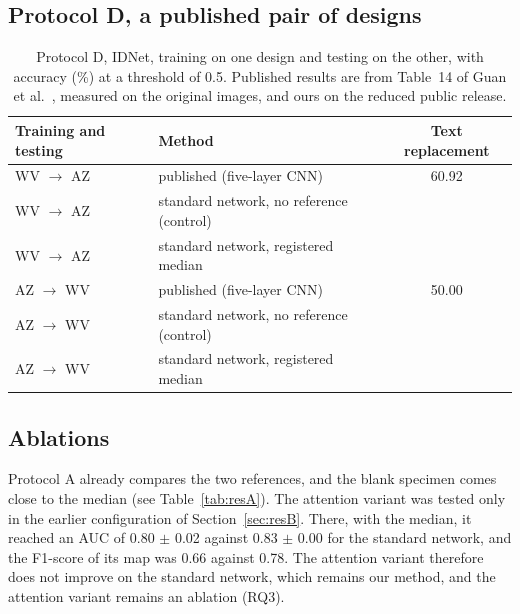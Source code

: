 \documentclass[12pt,a4paper]{article}
\newif\ifshowguidance
\newcommand{\todo}[1]{\ifshowguidance\leavevmode{\color{gray}\itshape [#1]}\fi}
\begin{document}
\subsection{Protocol D, a published pair of designs}
\begin{table}[H]
\centering\small
\setlength{\tabcolsep}{4pt}
\caption{Protocol D, IDNet, training on one design and testing on the other, with accuracy (\%) at a threshold of 0.5. Published results are from Table~14 of Guan et al.~\cite{guan2024idnetarxiv}, measured on the original images, and ours on the reduced public release.}
\label{tab:resD}
\begin{tabular}{llc}
\toprule
Training and testing & Method & Text replacement \\
\midrule
WV $\rightarrow$ AZ & published (five-layer CNN) & 60.92 \\
WV $\rightarrow$ AZ & standard network, no reference (control) & \todo{} \\
WV $\rightarrow$ AZ & standard network, registered median & \todo{} \\
\midrule
AZ $\rightarrow$ WV & published (five-layer CNN) & 50.00 \\
AZ $\rightarrow$ WV & standard network, no reference (control) & \todo{} \\
AZ $\rightarrow$ WV & standard network, registered median & \todo{} \\
\bottomrule
\end{tabular}
\end{table}

\subsection{Ablations}
Protocol A already compares the two references, and the blank specimen comes close to the median (see Table~\ref{tab:resA}). The attention variant was tested only in the earlier configuration of Section~\ref{sec:resB}. There, with the median, it reached an AUC of 0.80 $\pm$ 0.02 against 0.83 $\pm$ 0.00 for the standard network, and the F1-score of its map was 0.66 against 0.78. The attention variant therefore does not improve on the standard network, which remains our method, and the attention variant remains an ablation (RQ3). \todo{A single genuine card as the reference, an unregistered median, a network without the zone channel, and the input size of the published models, with one seed each.}
\end{document}
